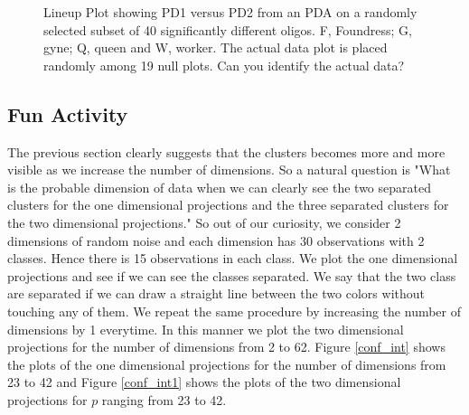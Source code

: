 \documentclass[12]{report}
\begin{document}
\begin{figure}[hbtp]
   \centering
       \caption{Lineup Plot showing PD1 versus PD2 from an PDA on a randomly selected subset of 40 significantly different oligos. F, Foundress; G, gyne; Q, queen and W, worker. The actual data plot is placed randomly among 19 null plots. Can you identify the actual data?  }
       \label{toth_pda}
\end{figure}   

\subsection{Fun Activity}

The previous section clearly suggests that the clusters becomes more and more visible as we increase the number of dimensions. So a natural question is "What is the probable dimension of data when we can clearly see the two separated clusters for the one dimensional projections and the three separated clusters for the two dimensional projections." So out of our curiosity,  we consider 2 dimensions of random noise and each dimension has 30 observations with 2 classes. Hence there is 15 observations in each class. We plot the one dimensional projections and see if we can see the classes separated. We say that the two class are separated if we can draw a straight line between the two colors without touching any of them. We repeat the same procedure by increasing the number of dimensions by 1 everytime. In this manner we plot the two dimensional projections for the number of dimensions from 2 to 62. Figure \ref{conf_int} shows the plots of the one dimensional projections for the number of dimensions from 23 to 42 and Figure \ref{conf_int1} shows the plots of the two dimensional projections for $p$ ranging from 23 to 42.
\end{document}
